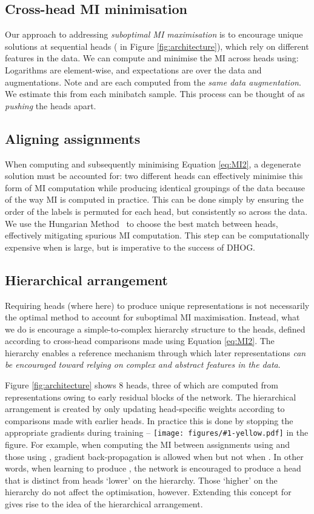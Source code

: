 \documentclass[runningheads]{llncs}
\newcommand*\yellowcircle[1]{\protect\texttt{[image: figures/\#1-yellow.pdf]}}
\begin{document}
\subsection{Cross-head MI minimisation}\label{sec:mimin}
Our approach to addressing \emph{suboptimal MI maximisation} is to encourage unique solutions at sequential heads ( in Figure \ref{fig:architecture}), which rely on different features in the data. We can compute and minimise the MI across heads using:
{}
Logarithms are element-wise, and expectations are over the data and augmentations. Note  and  are each computed from the \emph{same data augmentation}. We estimate this from each minibatch sample. This process can be thought of as \emph{pushing} the heads apart.

\subsection{Aligning assignments}
When computing and subsequently minimising Equation \ref{eq:MI2}, a degenerate solution must be accounted for: two different heads can effectively minimise this form of MI computation while producing identical groupings of the data because of the way MI is computed in practice. This can be done simply by ensuring the order of the labels is permuted for each head, but consistently so across the data. We use the Hungarian Method~\cite{kuhn1955hungarian} to choose the best match between heads, effectively mitigating spurious MI computation. This step can be computationally expensive when  is large, but is imperative to the success of DHOG.


\subsection{Hierarchical arrangement}\label{sec:arrange}
Requiring  heads (where  here) to produce unique representations is not necessarily the optimal method to account for suboptimal MI maximisation. Instead, what we do is encourage a simple-to-complex hierarchy structure to the heads, defined according to cross-head comparisons made using Equation \ref{eq:MI2}. The hierarchy enables a reference mechanism through which later representations \emph{can be encouraged toward relying on complex and abstract features in the data}. 

Figure \ref{fig:architecture} shows 8 heads, three of which are computed from representations owing to early residual blocks of the network. The hierarchical arrangement is created by only updating head-specific weights according to comparisons made with earlier heads. In practice this is done by stopping the appropriate gradients during training -- \yellowcircle{6} in the figure. For example, when computing the MI between assignments using  and those using , gradient back-propagation is allowed when  but not when . In other words, when learning to produce , the network is encouraged to produce a head that is distinct from heads `lower' on the hierarchy. Those `higher' on the hierarchy do not affect the optimisation, however. Extending this concept for  gives rise to the idea of the hierarchical arrangement.
\end{document}
